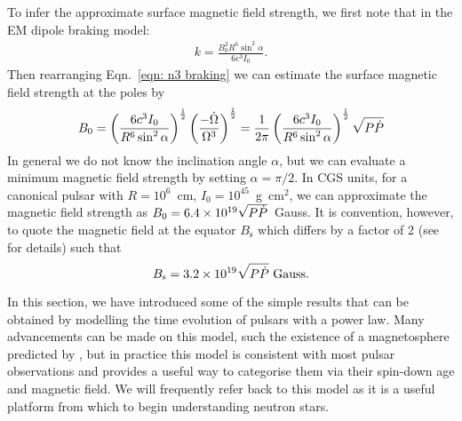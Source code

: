To infer the approximate surface magnetic field strength, we first note that
in the EM dipole braking model:
\begin{align}
k = \frac{B_0^{2} R^{6} \sin^{2}\alpha}{6c^{3}I_0}.
\end{align}
Then rearranging Eqn.~\eqref{eqn: n3 braking} we can estimate the surface
magnetic field strength at the poles by
\begin{equation}
    B_{0} = \left(\frac{6 c^{3} I_{0}}{R^{6} \sin^{2}\alpha}\right)^{\frac{1}{2}} 
            \left(\frac{-\dot{\Omega}}{\Omega^{3}}\right)^{\frac{1}{2}}
          = \frac{1}{2\pi}\left(\frac{6 c^{3} I_{0}}{R^{6} \sin^{2}\alpha}\right)^{\frac{1}{2}}
           \sqrt{P \dot{P}}
\label{eqn: surface magnetic field}
\end{equation}
In general we do not know the inclination angle $\alpha$, but we can evaluate a
minimum magnetic field strength by setting $\alpha=\pi/2$. In CGS units, for a
canonical pulsar with $R=10^{6}$~cm, $I_{0}=10^{45}$~g~cm$^{2}$, we can
approximate the magnetic field strength as $B_{0} = 6.4 \times 10^{19} \sqrt{P
\dot{P}}$~Gauss. It is convention, however, to quote the magnetic field at the equator
$B_\mathrm{s}$ which differs by a factor of 2 (see \citet{Lyne2012book} for
details) such that
\begin{equation}
    B_{\mathrm{s}} = 3.2 \times 10^{19} \sqrt{P \dot{P}}\textrm{ Gauss}.
\label{eqn: surface magnetic field canonical}
\end{equation}

In this section, we have introduced some of the simple results that can be
obtained by modelling the time evolution of pulsars with a power law. Many
advancements can be made on this model, such the existence of a magnetosphere
predicted by \citet{Goldreich1969}, but in practice this model is consistent
with most pulsar observations and provides a useful way to categorise them via
their spin-down age and magnetic field. We will
frequently refer back to this model as it is a useful platform from which
to begin understanding neutron stars.


